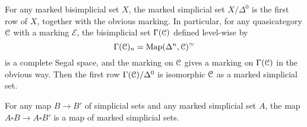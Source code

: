 \documentclass[main.tex]{subfiles}
\begin{document}
\begin{example}
  For any marked bisimplicial set $X$, the marked simplicial set $X / \Delta^{0}$ is the first row of $X$, together with the obvious marking. In particular, for any quasicategory $\mathcal{C}$ with a marking $\mathcal{E}$, the bisimplicial set $\Gamma(\mathcal{C})$ defined level-wise by
  \begin{equation*}
    \Gamma(\mathcal{C})_{n} = \mathrm{Map}(\Delta^{n}, \mathcal{C})^{\simeq}
  \end{equation*}
  is a complete Segal space, and the marking on $\mathcal{C}$ gives a marking on $\Gamma(\mathcal{C})$ in the obvious way. Then the first row $\Gamma(\mathcal{C}) / \Delta^{0}$ is isomorphic $\mathcal{C}$ as a marked simplicial set.
\end{example}

\begin{example}
  \label{eg:map_identity_on_first_component_is_map_of_marked}
  For any map $B \to B'$ of simplicial sets and any marked simplicial set $A$, the map $A \square B \to A \square B'$ is a map of marked simplicial sets.
\end{example}
\end{document}
